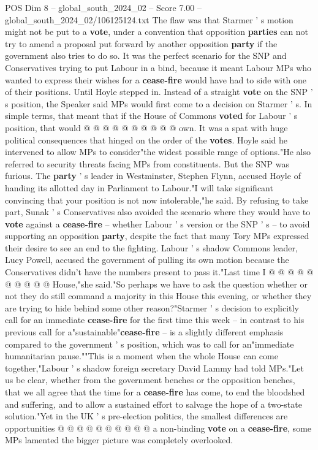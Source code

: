 \begin{textsample}{POS Dim 8 – global\_south\_2024\_02 – Score 7.00 – global\_south\_2024\_02/106125124.txt}
The flaw was that Starmer ' s motion might not be put to a \textbf{vote}, under a convention that opposition \textbf{parties} can not try to amend a proposal put forward by another opposition \textbf{party} if the government also tries to do so.
It was the perfect scenario for the SNP and Conservatives trying to put Labour in a bind, because it meant Labour MPs who wanted to express their wishes for a \textbf{cease-fire} would have had to side with one of their positions.
Until Hoyle stepped in.
Instead of a straight \textbf{vote} on the SNP ' s position, the Speaker said MPs would first come to a decision on Starmer ' s.
In simple terms, that meant that if the House of Commons \textbf{voted} for Labour ' s position, that would @ @ @ @ @ @ @ @ @ @ own.
It was a spat with huge political consequences that hinged on the order of the \textbf{votes}.
Hoyle said he intervened to allow MPs to consider"the widest possible range of options."He also referred to security threats facing MPs from constituents.
But the SNP was furious.
The \textbf{party} ' s leader in Westminster, Stephen Flynn, accused Hoyle of handing its allotted day in Parliament to Labour."I will take significant convincing that your position is not now intolerable,"he said.
By refusing to take part, Sunak ' s Conservatives also avoided the scenario where they would have to \textbf{vote} against a \textbf{cease-fire} -- whether Labour ' s version or the SNP ' s -- to avoid supporting an opposition \textbf{party}, despite the fact that many Tory MPs expressed their desire to see an end to the fighting.
Labour ' s shadow Commons leader, Lucy Powell, accused the government of pulling its own motion because the Conservatives didn't have the numbers present to pass it."Last time I @ @ @ @ @ @ @ @ @ @ House,"she said."So perhaps we have to ask the question whether or not they do still command a majority in this House this evening, or whether they are trying to hide behind some other reason?"Starmer ' s decision to explicitly call for an immediate \textbf{cease-fire} for the first time this week -- in contrast to his previous call for a"sustainable"\textbf{cease-fire} -- is a slightly different emphasis compared to the government ' s position, which was to call for an"immediate humanitarian pause.""This is a moment when the whole House can come together,"Labour ' s shadow foreign secretary David Lammy had told MPs."Let us be clear, whether from the government benches or the opposition benches, that we all agree that the time for a \textbf{cease-fire} has come, to end the bloodshed and suffering, and to allow a sustained effort to salvage the hope of a two-state solution."Yet in the UK ' s pre-election politics, the smallest differences are opportunities @ @ @ @ @ @ @ @ @ @ a non-binding \textbf{vote} on a \textbf{cease-fire}, some MPs lamented the bigger picture was completely overlooked.

\end{textsample}
